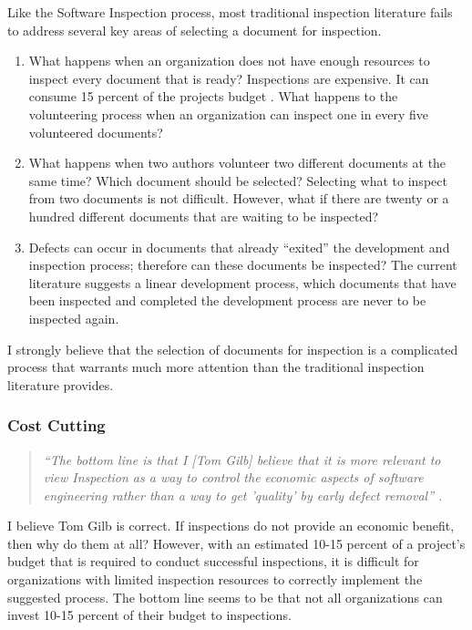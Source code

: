 Like the Software Inspection process, most traditional inspection
literature fails to address several key areas of selecting a document for
inspection.

\begin{enumerate}
\item What happens when an organization does not have enough resources to
  inspect every document that is ready? Inspections are expensive. It can
  consume 15 percent of the projects budget \cite{Gilb93}. What happens to
  the volunteering process when an organization can inspect one in every
  five volunteered documents? 
\item What happens when two authors volunteer two different documents at
  the same time? Which document should be selected? Selecting what to
  inspect from two documents is not difficult. However, what if there are
  twenty or a hundred different documents that are waiting to be inspected?
\item Defects can occur in documents that already ``exited'' the
  development and inspection process; therefore can these documents be
  inspected? The current literature suggests a linear development process,
  which documents that have been inspected and completed the development
  process are never to be inspected again.
\end{enumerate}

I strongly believe that the selection of documents for inspection is a
complicated process that warrants much more attention than the traditional
inspection literature provides.

\subsubsection{Cost Cutting}
\begin{quotation}
  \textit{``The bottom line is that I [Tom Gilb] believe that it is more
    relevant to view Inspection as a way to control the economic aspects of
    software engineering rather than a way to get 'quality' by early defect
    removal'' \cite{Gilb99}.}
\end{quotation}

I believe Tom Gilb is correct. If inspections do not provide an economic
benefit, then why do them at all? However, with an estimated 10-15 percent
of a project's budget that is required to conduct successful inspections,
it is difficult for organizations with limited inspection resources to
correctly implement the suggested process. The bottom line seems to be that
not all organizations can invest 10-15 percent of their budget to
inspections.


